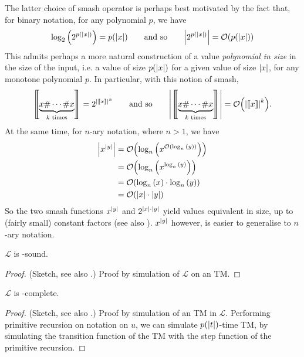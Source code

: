 The latter choice of smash operator is perhaps best motivated by the fact that,
for binary notation, for any  polynomial $p$, we
have\begin{align*}
%
\log_2\p{2^{p\p{\card{x}}}} = p\p{\card{x}}
%
\quad \quad \text{and so} \quad \quad
%
\card{2^{p\p{\card{x}}}} = \bigOh{p\p{\card{x}}}
%
\end{align*} This admits perhaps a more natural construction of a value
\emph{polynomial in size} in the size of the input, i.e. a value of size
$p{\mathopen{}\left({{\mathopen{}\left|{x}\right|\mathclose{}}}\right)\mathclose{}}$ for a given value of size ${\mathopen{}\left|{x}\right|\mathclose{}}$, for any monotone
polynomial $p$. In particular, with this notion of smash,\begin{align*}
%
\sem{\underbrace{x \smashf{} \cdots \smashf{} x}_{\text{$k$ times}}} =
2^{\card{\sem{x}}^k}
%
\quad\quad \text{and so} \quad\quad
%
\card{\sem{\underbrace{x \smashf{} \cdots \smashf{} x}_{\text{$k$ times}}}} =
\bigOh{\card{\sem{x}}^k}.
%
\end{align*} At the same time, for $n$-ary notation, where $n>1$, we
have\begin{align*}
%
\card{x^\card{y}} &= \bigOh{\log_n\p{x^\bigOh{\log_n\p{y}}}} \\
%
                  &= \bigOh{\log_n\p{x^{\log_n\p{y}}}} \\
%
                  &= \bigOh{\log_n\p{x} \cdot \log_n\p{y}} \\
%
                  &= \bigOh{\card{x} \cdot \card{y}}
%
\end{align*} So the two smash functions $x^{\mathopen{}\left|{y}\right|\mathclose{}}$ and $2^{{\mathopen{}\left|{x}\right|\mathclose{}} \cdot
{\ensuremath{\mathopen{}\left|{y}\right|\mathclose{}}}}$ yield values equivalent in size, up to (fairly small) constant
factors (see also ). $x^{\mathopen{}\left|{y}\right|\mathclose{}}$ however, is easier to
generalise to $n$-ary notation.

\begin{lemma} \label{lem:l-fptime-sound} $\mathcal{L}$ is \FPTIME{}-sound.
\end{lemma}

\begin{proof} (Sketch, see also \cite{rose-1984, tourlakis-1984, clote-1999}.)
Proof by simulation of $\mathcal{L}$ on an \FPTIME{} TM.   \end{proof}

\begin{lemma} \label{lem:l-fptime-complete} $\mathcal{L}$ is
\FPTIME{}-complete. \end{lemma}

\begin{proof} (Sketch, see also \cite{rose-1984, tourlakis-1984, clote-1999}.)
Proof by simulation of an \FPTIME{} TM in $\mathcal{L}$. Performing primitive
recursion on notation on $u$, we can simulate $p{\mathopen{}\left({{\mathopen{}\left|{t}\right|\mathclose{}}}\right)\mathclose{}}$-time TM, by
simulating the transition function of the TM with the step function of the
primitive recursion.   \end{proof}

